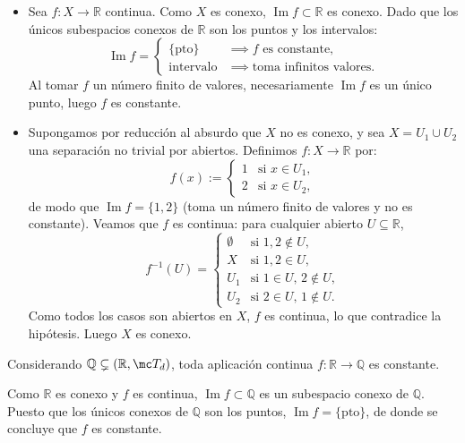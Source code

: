 \begin{dem}
\begin{itemize}
    \item[$(\Rightarrow)$] Sea $f \colon X \to \mathbb{R}$ continua. Como $X$ es conexo, $\operatorname{Im} f \subset \mathbb{R}$ es conexo. Dado que los únicos subespacios conexos de $\mathbb{R}$ son los puntos y los intervalos:
    \[
        \operatorname{Im} f = \begin{cases}
            \{\text{pto}\} & \implies f \text{ es constante}, \\
            \text{intervalo} & \implies \text{toma infinitos valores}.
        \end{cases}
    \]
    Al tomar $f$ un número finito de valores, necesariamente $\operatorname{Im} f$ es un único punto, luego $f$ es constante.

    \item[$(\Leftarrow)$] Supongamos por reducción al absurdo que $X$ no es conexo, y sea $X = U_1 \cup U_2$ una separación no trivial por abiertos. Definimos $f \colon X \to \mathbb{R}$ por:
    \[
        f(x) := \begin{cases}
            1 & \text{si } x \in U_1, \\
            2 & \text{si } x \in U_2,
        \end{cases}
    \]
    de modo que $\operatorname{Im} f = \{1, 2\}$ (toma un número finito de valores y no es constante). Veamos que $f$ es continua: para cualquier abierto $U \subseteq \mathbb{R}$,
    \[
        f^{-1}(U) = \begin{cases}
            \emptyset & \text{si } 1, 2 \notin U, \\
            X & \text{si } 1, 2 \in U, \\
            U_1 & \text{si } 1 \in U, \, 2 \notin U, \\
            U_2 & \text{si } 2 \in U, \, 1 \notin U.
        \end{cases}
    \]
    Como todos los casos son abiertos en $X$, $f$ es continua, lo que contradice la hipótesis. Luego $X$ es conexo.
\end{itemize}
\end{dem}

\begin{ejem}
Considerando $\mathbb{Q} \subsetneq (\mathbb{R}, \mc T_d)$, toda aplicación continua $f \colon \mathbb{R} \to \mathbb{Q}$ es constante.
\end{ejem}

\begin{dem}
Como $\mathbb{R}$ es conexo y $f$ es continua, $\operatorname{Im} f \subset \mathbb{Q}$ es un subespacio conexo de $\mathbb{Q}$. Puesto que los únicos conexos de $\mathbb{Q}$ son los puntos, $\operatorname{Im} f = \{\text{pto}\}$, de donde se concluye que $f$ es constante.
\end{dem}
